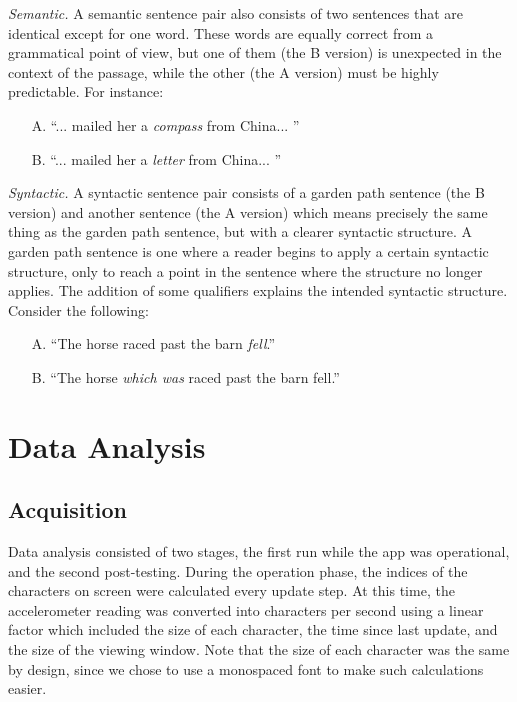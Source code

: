 \documentclass[11pt,letterpaper]{article}
\begin{document}
	\textit{Semantic.} A semantic sentence pair also consists of two sentences that are identical except for one word. These words are equally correct from a grammatical point of view, but one of them (the B version) is unexpected in the context of the passage, while the other (the A version) must be highly predictable. For instance:
	\begin{itemize}[noitemsep, nolistsep]
		\item[A.] ``... mailed her a \textit{compass} from China... ''
		\item[B.] ``... mailed her a \textit{letter} from China... ''
	\end{itemize}
	
	\textit{Syntactic.} A syntactic sentence pair consists of a garden path sentence (the B version) and another sentence (the A version) which means precisely the same thing as the garden path sentence, but with a clearer syntactic structure. A garden path sentence is one where a reader begins to apply a certain syntactic structure, only to reach a point in the sentence where the structure no longer applies. The addition of some qualifiers explains the intended syntactic structure. Consider the following:
	\begin{itemize}[noitemsep, nolistsep]
		\item[A.] ``The horse raced past the barn \textit{fell}.''
		\item[B.] ``The horse \textit{which was} raced past the barn fell.''
	\end{itemize}
	
	\section{Data Analysis}
	
	\subsection{Acquisition}
	
	Data analysis consisted of two stages, the first run while the app was operational, and the second post-testing. During the operation phase, the indices of the characters on screen were calculated every update step. At this time, the accelerometer reading was converted into characters per second using a linear factor which included the size of each character, the time since last update, and the size of the viewing window. Note that the size of each character was the same by design, since we chose to use a monospaced font to make such calculations easier.
	
\end{document}
